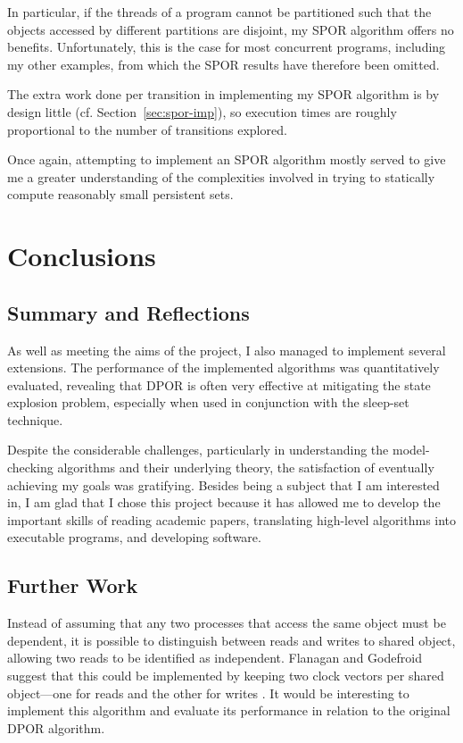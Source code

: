 \documentclass[12pt,a4paper,twoside,openright]{report}
\begin{document}
In particular, if the threads of
a program cannot be partitioned
such that the objects accessed by different
partitions are disjoint, my SPOR algorithm
offers no benefits. Unfortunately, this
is the case for most concurrent programs,
including my other examples, from which
the SPOR results have therefore been omitted.

The extra work done per transition
in implementing my SPOR
algorithm is by design little
(cf. Section~\ref{sec:spor-imp}), so
execution times are roughly proportional
to the number of transitions explored.

Once again, attempting to implement
an SPOR algorithm mostly served to give
me a greater understanding
of the complexities involved in trying to
statically compute reasonably small persistent sets.

\chapter{Conclusions}

\section{Summary and Reflections}

As well as meeting the aims of the
project, I also
managed to implement several
extensions. The performance
of the implemented algorithms
was quantitatively evaluated,
revealing that DPOR is often
very effective at mitigating
the state explosion problem,
especially when used in
conjunction with the
sleep-set technique.

Despite the considerable
challenges, particularly in 
understanding
the model-checking algorithms
and their underlying theory, the
satisfaction of eventually achieving
my goals was gratifying. Besides
being a subject that I am interested
in, I am glad that I chose this project because
it has allowed me to develop the important skills
of reading academic papers, translating high-level
algorithms into executable programs, and
developing software.


\section{Further Work}
Instead of assuming that any
two processes that access the
same object must be dependent,
it is possible to distinguish
between reads and writes to
shared object, allowing
two reads to be identified
as independent.
Flanagan and Godefroid suggest
that this could be implemented
by keeping two clock vectors per
shared object---one for reads and
the other for writes \cite{flan05}.
It would
be interesting to implement
this algorithm and evaluate its
performance in relation to the
original DPOR algorithm.
\end{document}
